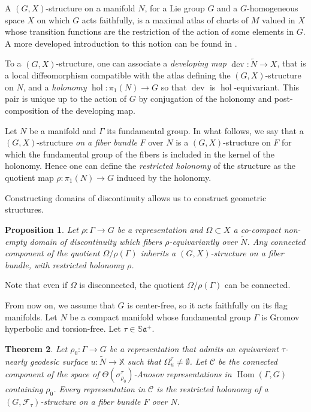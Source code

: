 \documentclass[reqno,10pt]{amsart}
\theoremstyle{plain}
\newtheorem{thm}{Theorem}[section]
\newtheorem{prop}[thm]{Proposition}
\theoremstyle{definition}
\theoremstyle{remark}
\newcommand{\type}{\tau}
\newcommand{\Sph}{\mathbb{S}}
\DeclareMathOperator{\dev}{dev}
\DeclareMathOperator{\hol}{hol}
\DeclareMathOperator{\Hom}{Hom}
\newcommand{\X}{\mathbb{X}}
\begin{document}
\medskip

A $(G,X)$-structure on a manifold $N$, for a Lie group $G$ and a $G$-homogeneous space $X$ on which $G$ acts faithfully, is a maximal atlas of charts of $M$ valued in $X$ whose transition functions are the restriction of the action of some elements in $G$. A more developed introduction to this notion can be found in \cite{GXStruct}.

To a $(G,X)$-structure, one can associate a \emph{developing map} $\dev:\widetilde{N}\to X$, that is a local diffeomorphism compatible with the atlas defining the $(G,X)$-structure on $N$, and a \emph{holonomy} $\hol:\pi_1(N)\to G$ so that $\dev$ is $\hol$-equivariant. This pair is unique up to the action of $G$ by conjugation of the holonomy and post-composition of the developing map. 

\medskip

Let $N$ be a manifold and $\Gamma$ its fundamental group. In what follows, we say that a $(G,X)$-structure \emph{on a fiber bundle} $F$ over $N$ is a $(G,X)$-structure on $F$ for which the fundamental group of the fibers is included in the kernel of the holonomy. Hence one can define the \emph{restricted holonomy} of the structure as the quotient map $\rho:\pi_1(N)\to G$ induced by the holonomy. 

\medskip

Constructing domains of discontinuity allows us to construct geometric structures.

\begin{prop} 
Let $\rho:\Gamma\to G$ be a representation and $\Omega\subset X$ a co-compact non-empty domain of discontinuity which fibers $\rho$-equivariantly over $\widetilde{N}$. Any connected component of the quotient $\Omega/\rho(\Gamma)$ inherits a $(G,X)$-structure \emph{on a fiber bundle}, with restricted holonomy $\rho$.
\end{prop}

 Note that even if $\Omega$ is disconnected, the quotient $\Omega/\rho(\Gamma)$ can be connected. 
 
\medskip
 
From now on, we assume that $G$ is center-free, so it acts faithfully on its flag manifolds. Let $N$ be a compact manifold whose fundamental group $\Gamma$ is Gromov hyperbolic and torsion-free. Let $\tau \in \Sph\mathfrak{a}^+$.

\begin{thm}
\label{thm:Application}
Let $\rho_0:\Gamma\to G$ be a representation that admits an equivariant $\tau$-nearly geodesic surface $u:\widetilde{N}\to \X$ such that $\Omega^\type_{u}\neq \emptyset$. Let $\mathcal{C}$ be the connected component of the space of $\Theta(\sigma^\type_{\rho_0})$-Anosov representations in $\Hom(\Gamma,G)$ containing $\rho_0$. Every representation in $\mathcal{C}$ is the restricted holonomy of a $(G,\mathcal{F}_\type)$-structure \emph{on a fiber bundle} $F$ over $N$.
\end{thm}
\end{document}
